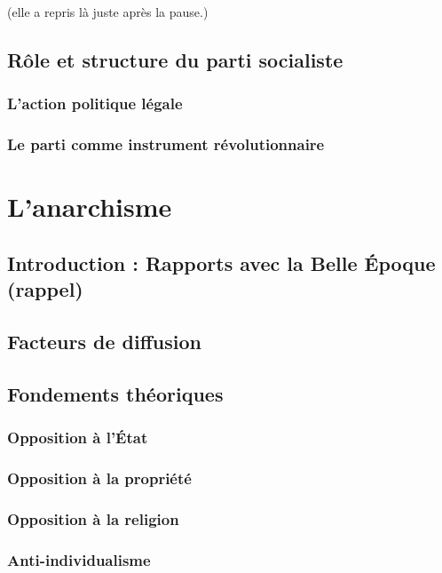 \documentclass[12pt]{report}
\begin{document}
(elle a repris là juste après la pause.)

\subsection{Rôle et structure du parti socialiste}

\subsubsection{L'action politique légale}

\subsubsection{Le parti comme instrument révolutionnaire}

\section{L'anarchisme}

\subsection*{Introduction : Rapports avec la Belle Époque (rappel)}

\subsection{Facteurs de diffusion}

\subsection{Fondements théoriques}

\subsubsection{Opposition à l'État}

\subsubsection{Opposition à la propriété}

\subsubsection{Opposition à la religion}

\subsubsection{Anti-individualisme}
\end{document}
